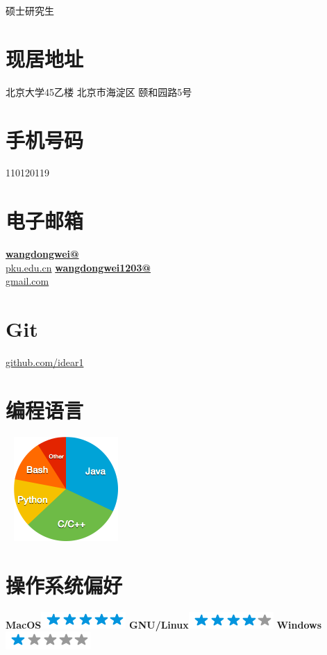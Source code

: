 \documentclass[]{friggeri-cv}
\begin{document}
      {硕士研究生}
      

\begin{aside}
  \section{现居地址}
    北京大学45乙楼
    北京市海淀区
    颐和园路5号%
    ~
  \section{手机号码}
    110120119
    ~
  \section{电子邮箱}
    \href{mailto:wangdongwei@pku.edu.cn}{\textbf{wangdongwei@}\\pku.edu.cn}
    \href{mailto:wangdongwei1203@gmail.com}{\textbf{wangdongwei1203@}\\gmail.com}
    ~
  \section{Git}
    \href{https://github.com/idear1}{github.com/idear1}
    ~
  \section{编程语言}
    ~
    \includegraphics[scale=0.7]{img/programming.png}
    ~
  \section{操作系统偏好}
    \textbf{MacOS}\includegraphics[scale=0.40]{img/5stars.png}
    \textbf{GNU/Linux}\includegraphics[scale=0.40]{img/4stars.png}
    \textbf{Windows}\includegraphics[scale=0.40]{img/1stars.png}
    ~

\end{aside}
\end{document}

